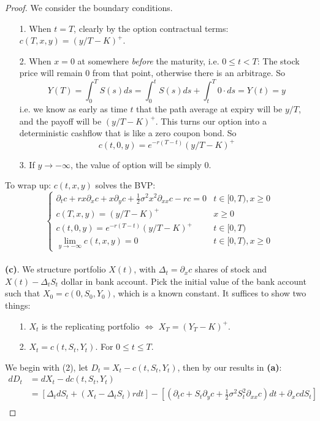 \documentclass[a4paper, 10pt]{article}
\theoremstyle{definition}
\theoremstyle{hSol}
\begin{document}
\begin{proof}
We consider the boundary conditions.
\begin{itemize}
	\item[1.] When $t=T$, clearly by the option contractual terms: $c(T,x,y) = (y/T-K)^{+}$.
	\item[2.] When $x=0$ at somewhere \emph{before} the maturity, i.e. $0\leq t<T$: The stock price will remain 0 from that point, otherwise there is an arbitrage. So 
	$$
	Y(T) = \int_0^T S(s)ds = \int_0^t S(s)ds + \int_t^T 0 \cdot ds = Y(t) = y
	$$
	i.e. we know as early as time $t$ that the path average at expiry will be $y/T$, and the payoff will be $(y/T - K)^+$. This turns our option into a deterministic cashflow that is like a zero coupon bond. So
	$$
	c(t,0,y) = e^{-r(T-t)}(y/T - K)^+
	$$
	\item[3.] If $y\to -\infty$, the value of option will be simply $0$.
\end{itemize}
To wrap up: $c(t,x,y)$ solves the BVP:
\begin{equation}
	\begin{cases}
	\partial_t c +rx\partial_x c  + x\partial_y c+\frac{1}{2}\sigma^2 x^2 \partial_{xx}c -  rc = 0 & t\in[0,T), x\geq 0\\
	c(T,x,y) = (y/T-K)^{+} & x\geq0\\
	c(t,0,y) = e^{-r(T-t)}(y/T - K)^+ & t\in[0,T)\\
	\lim\limits_{y\rightarrow -\infty}c(t,x,y) = 0 & t\in[0,T), x\geq 0
	\end{cases}
\end{equation}
~\\
\textbf{(c)}. We structure portfolio $X(t)$, with $\Delta_t = \partial_x c$ shares of stock and $X(t)-\Delta_t S_t$ dollar in bank account. Pick the initial value of the bank account such that $X_0=c(0,S_0,Y_0)$, which is a known constant. It suffices to show two things:
\begin{itemize}
	\item[1.] $X_t$ is the replicating portfolio $\iff$ $X_T = (Y_T-K)^+$.
	\item[2.] $X_t = c(t,S_t,Y_t)$. For $0\leq t \leq T$.
\end{itemize}
We begin with (2), let $D_t = X_t - c(t,S_t,Y_t)$, then by our results in \textbf{(a)}:
\begin{equation}
	\begin{split}
		dD_t &= dX_t - dc(t,S_t,Y_t) \\
		&=\left[\Delta_t dS_t + (X_t - \Delta_t S_t) rdt\right] - \left[\left(\partial_t c+S_t\partial_y c+\frac{1}{2}\sigma^2 S_t^2 \partial_{xx}c\right)dt + \partial_x c dS_t\right] \\

\end{split}
\end{equation}
\end{proof}
\end{document}
